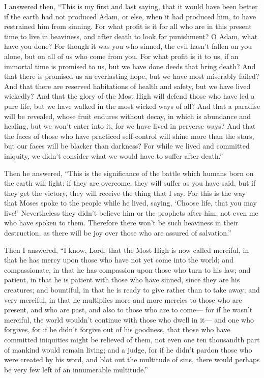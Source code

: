  I answered then, ``This is my first and last saying, that
it would have been better if the earth had not produced Adam, or else,
when it had produced him, to have restrained him from sinning.
 For what profit is it for all who are in this present
time to live in heaviness, and after death to look for punishment?
 O Adam, what have you done? For though it was you who
sinned, the evil hasn't fallen on you alone, but on all of us who come
from you.  For what profit is it to us, if an immortal
time is promised to us, but we have done deeds that bring death?
 And that there is promised us an everlasting hope, but we
have most miserably failed?  And that there are reserved
habitations of health and safety, but we have lived wickedly?
 And that the glory of the Most High will defend those who
have led a pure life, but we have walked in the most wicked ways of all?
 And that a paradise will be revealed, whose fruit endures
without decay, in which is abundance and healing, but we won't enter
into it,  for we have lived in perverse ways?
 And that the faces of those who have practiced
self-control will shine more than the stars, but our faces will be
blacker than darkness?  For while we lived and committed
iniquity, we didn't consider what we would have to suffer after death.''

 Then he answered, ``This is the significance of the
battle which humans born on the earth will fight:  if they
are overcome, they will suffer as you have said, but if they get the
victory, they will receive the thing that I say.  For this
is the way that Moses spoke to the people while he lived, saying,
`Choose life, that you may live!'  Nevertheless they
didn't believe him or the prophets after him, not even me who have
spoken to them.  Therefore there won't be such heaviness
in their destruction, as there will be joy over those who are assured of
salvation.''

 Then I answered, ``I know, Lord, that the Most High is
now called merciful, in that he has mercy upon those who have not yet
come into the world;  and compassionate, in that he has
compassion upon those who turn to his law;  and patient,
in that he is patient with those who have sinned, since they are his
creatures;  and bountiful, in that he is ready to give
rather than to take away;  and very merciful, in that he
multiplies more and more mercies to those who are present, and who are
past, and also to those who are to come---  for if he
wasn't merciful, the world wouldn't continue with those who dwell in
it---  and one who forgives, for if he didn't forgive out
of his goodness, that those who have committed iniquities might be
relieved of them, not even one ten thousandth part of mankind would
remain living;  and a judge, for if he didn't pardon those
who were created by his word, and blot out the multitude of sins,
 there would perhaps be very few left of an innumerable
multitude.''

